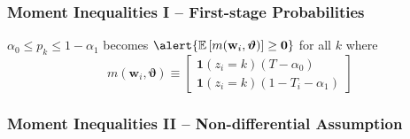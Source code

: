 \documentclass[handout]{beamer}
\begin{document}
\begin{frame}[label=INEQ_APPEND]
  \frametitle{Moment Inequalities I -- First-stage Probabilities}

  $\alpha_0 \leq p_k \leq 1 - \alpha_1$ becomes $\alert{\mathbb{E}\left[ m(\mathbf{w}_i,\boldsymbol{\vartheta} ) \right] \geq \mathbf{0}}$ for all $k$ where
\[
  m(\mathbf{w}_i, \boldsymbol{\vartheta}) \equiv \left[
  \begin{array}{l}
    \mathbf{1}(z_i=k)(T - \alpha_0) \\
    \mathbf{1}(z_i = k) (1 - T_i - \alpha_1) 
  \end{array}
\right]
\]
  
\end{frame}

\begin{frame}
  \frametitle{Moment Inequalities II -- Non-differential Assumption}

  \scriptsize


\end{frame}
\end{document}
